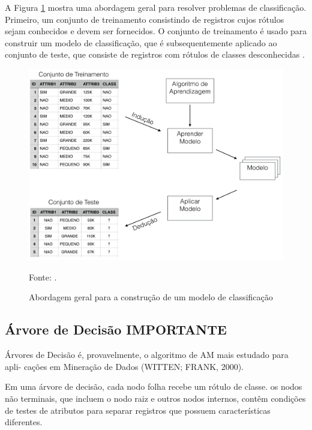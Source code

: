 \documentclass[
	12pt,				%
	openright,			%
	oneside,	
	a4paper,				%
	english,				%
	brazil				%
]{abntex2/abntex2} %
\begin{document}
	A Figura \ref{figabordagemModeloClassificacao} mostra uma abordagem geral para resolver problemas de classificação. Primeiro, um conjunto de treinamento consistindo de registros cujos rótulos sejam conhecidos e devem ser fornecidos. O conjunto de treinamento é usado para construir um modelo de classificação, que é subsequentemente aplicado ao conjunto de teste, que consiste de registros com rótulos de classes desconhecidas \cite{tan:2009}.
	\\
	\begin{figure}[!htb]
		\caption{\label{figabordagemModeloClassificacao} Abordagem geral para a construção de um modelo de classificação }
		\begin{center}
			\includegraphics[scale=0.3]{img/abordagemModeloClassificacao.png}
		\end{center}
		Fonte: \cite{tan:2009}.
	\end{figure}

	\subsection{Árvore de Decisão IMPORTANTE }
	
		Árvores de Decisão é, provavelmente, o algoritmo de AM mais estudado para apli- cações em Mineração de Dados (WITTEN; FRANK, 2000).
	
		Em uma árvore de decisão, cada nodo folha recebe um rótulo de classe. os nodos não terminais, que incluem o nodo raiz e outros nodos internos, contêm condições de testes de atributos para separar registros que possuem características diferentes.
		
\end{document}
